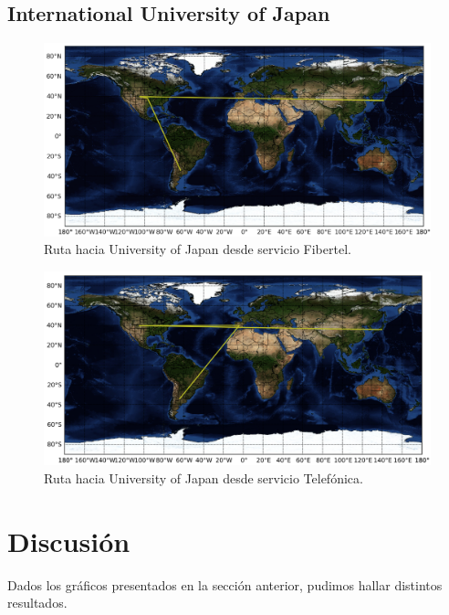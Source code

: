\documentclass[10pt, a4paper]{article}
\begin{document}
\subsection{International University of Japan}
\begin{figure}[H] %
\begin{center}
\includegraphics[width=400pt]{../imgs/map-iuj.png}
\caption{Ruta hacia University of Japan desde servicio Fibertel.}
\end{center}
\end{figure}

\begin{figure}[H] %
\begin{center}
\includegraphics[width=400pt]{../imgs/map-iuj(telef).png}
\caption{Ruta hacia University of Japan desde servicio Telefónica.}
\end{center}
\end{figure}




\newpage
\section{Discusión}
Dados los gráficos presentados en la sección anterior, pudimos hallar distintos resultados. 
\end{document}
